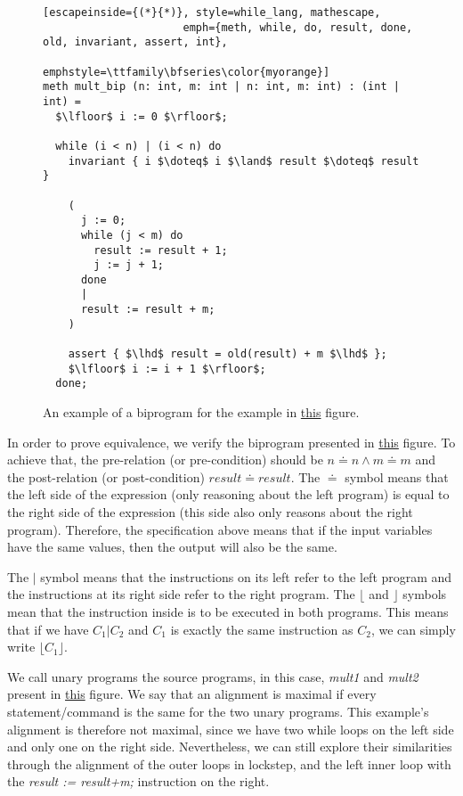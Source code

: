 \begin{figure}[h]
  \centering
  \noindent
  \begin{lstlisting}[escapeinside={(*}{*)}, style=while_lang, mathescape,
                      emph={meth, while, do, result, done, old, invariant, assert, int},
                      emphstyle=\ttfamily\bfseries\color{myorange}]
meth mult_bip (n: int, m: int | n: int, m: int) : (int | int) =
  $\lfloor$ i := 0 $\rfloor$;

  while (i < n) | (i < n) do
    invariant { i $\doteq$ i $\land$ result $\doteq$ result }

    (
      j := 0;
      while (j < m) do
        result := result + 1;
        j := j + 1;
      done
      |
      result := result + m;
    )

    assert { $\lhd$ result = old(result) + m $\lhd$ };
    $\lfloor$ i := i + 1 $\rfloor$;
  done;
  \end{lstlisting}
  \caption{An example of a biprogram for the example in \hyperref[fig:mult_source_programs]{this} figure.}
  \label{fig:mult_biprogram}
\end{figure}

In order to prove equivalence, we verify the biprogram presented in \hyperref[fig:mult_biprogram]{this} figure.
To achieve that, the pre-relation (or pre-condition) should be \(n \doteq n \land m \doteq m \) and the post-relation (or post-condition) \(result \doteq result\).
The $\doteq$ symbol means that the left side of the expression (only reasoning about the left program) is equal to the right side of the expression (this side also only reasons about the right program).
Therefore, the specification above means that if the input variables have the same values, then the output will also be the same.

The $|$ symbol means that the instructions on its left refer to the left program and the instructions at its right side refer to the right program.
The $\lfloor$ and $\rfloor$ symbols mean that the instruction inside is to be executed in both programs.
This means that if we have $C_1 | C_2$ and $C_1$ is exactly the same instruction as $C_2$, we can simply write $\lfloor C_1 \rfloor$.

We call unary programs the source programs, in this case, \emph{mult1} and \emph{mult2} present in \hyperref[fig:mult_source_programs]{this} figure.
We say that an alignment is maximal if every statement/command is the same for the two unary programs.
This example's alignment is therefore not maximal, since we have two while loops on the left side and only one on the right side.
Nevertheless, we can still explore their similarities through the alignment of the outer loops in lockstep, and the left inner loop with the \emph{result := result+m;} instruction on the right.

